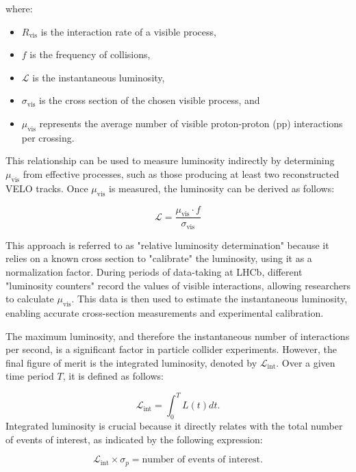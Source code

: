 where:
\begin{itemize}
\item  $R_{\text{vis}}$ is the interaction rate of a visible process,
\item  $f$ is the frequency of collisions,
\item  $\mathcal{L}$ is the instantaneous luminosity,
\item  $\sigma_{\text{vis}}$ is the cross section of the chosen visible process, and
\item  $\mu_{\text{vis}}$ represents the average number of visible proton-proton (pp) interactions per crossing.
\end{itemize}
This relationship can be used to measure luminosity indirectly by determining \(\mu_{\text{vis}}\) from effective processes, such as those producing at least two reconstructed VELO tracks. Once \(\mu_{\text{vis}}\) is measured, the luminosity can be derived as follows:

\begin{equation}
\mathcal{L} = \frac{\mu_{\text{vis}} \cdot f}{\sigma_{\text{vis}}}
\end{equation}

This approach is referred to as "relative luminosity determination" because it relies on a known cross section to "calibrate" the luminosity, using it as a normalization factor. During periods of data-taking at LHCb, different "luminosity counters" record the values of visible interactions, allowing researchers to calculate \(\mu_{\text{vis}}\). This data is then used to estimate the instantaneous luminosity, enabling accurate cross-section measurements and experimental calibration.


The maximum luminosity, and therefore the instantaneous number of interactions per second, is a significant factor in particle collider experiments. However, the final figure of merit is the integrated luminosity, denoted by $\mathcal{L}_{\text{int}}$. Over a given time period \(T\), it is defined as follows:

\begin{equation}
\mathcal{L}_{\text{int}} = \int_0^T L(t) dt .
\end{equation}
Integrated luminosity is crucial because it directly relates with the total number of events of interest, as indicated by the following expression:

\begin{equation}
\mathcal{L}_{\text{int}} \times \sigma_p = \text{number of events of interest}.
\end{equation}

